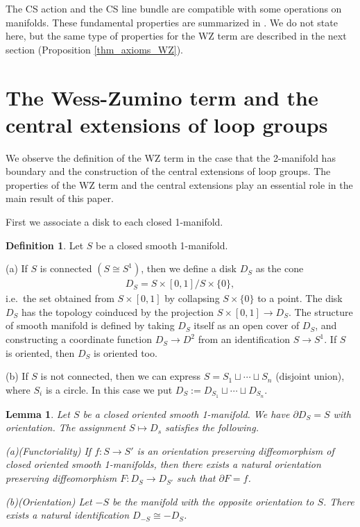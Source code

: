 \documentclass[a4paper,a4paper]{article}
\newtheorem{lem}[thm]{Lemma}
\theoremstyle{definition}
\newtheorem{dfn}[thm]{Definition}
\theoremstyle{remark}
\begin{document}
The CS action and the CS line bundle are compatible with some operations on manifolds. These fundamental properties are summarized in \cite{F1}. We do not state here, but the same type of properties for the WZ term are described in the next section (Proposition \ref{thm_axioms_WZ}).


\section{The Wess-Zumino term and the central extensions of loop groups}
\label{la_WZ_ce}

We observe the definition of the WZ term in the case that the 2-manifold has boundary and the construction of the central extensions of loop groups. The properties of the WZ term and the central extensions play an essential role in the main result of this paper.

\smallskip

First we associate a disk to each closed 1-manifold.

\begin{dfn}
Let $S$ be a closed smooth 1-manifold.

(a) If $S$ is connected $(S \cong S^1)$, then we define a disk $D_S$ as the cone 
\begin{eqnarray*}
D_S = S \times [0,1] / S \times \{0\} , 
\end{eqnarray*}
i.e.\ the set obtained from $S \times [0,1]$ by collapsing $S \times \{0\}$ to a point. The disk $D_S$ has the topology coinduced by the projection $S \times [0,1] \to D_S$. The structure of smooth manifold is defined by taking $D_S$ itself as an open cover of $D_S$, and constructing a coordinate function $D_S \to D^2$ from an identification $S \to S^1$. If $S$ is oriented, then $D_S$ is oriented too.

(b) If $S$ is not connected, then we can express $S = S_1 \sqcup \cdots \sqcup S_n$ (disjoint union), where $S_i$ is a circle. In this case we put $D_S := D_{S_1} \sqcup \cdots \sqcup D_{S_n}$.
\end{dfn}


\begin{lem} \label{lem_axiom_disk}
Let $S$ be a closed oriented smooth 1-manifold. We have $\partial D_S = S$ with orientation. The assignment $S \mapsto D_s$ satisfies the following.

(a)(Functoriality) If $f : S \to S'$ is an orientation preserving diffeomorphism of closed oriented smooth 1-manifolds, then there exists a natural orientation preserving diffeomorphism $F : D_S \to D_{S'}$ such that $\partial F = f$.

(b)(Orientation) Let $-S$ be the manifold with the opposite orientation to $S$. There exists a natural identification $D_{-S} \cong - D_S$.
\end{lem}
\end{document}
